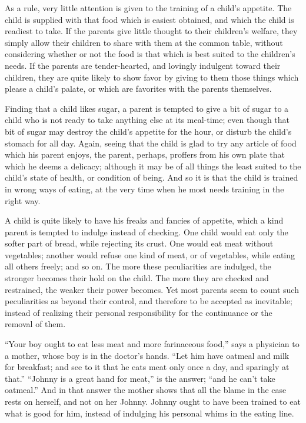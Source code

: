 \documentclass[
]{book}
\begin{document}
As a rule, very little attention is given to the training of a child's appetite. The child is supplied with that food which is easiest obtained, and which the child is readiest to take. If the parents give little thought to their children's welfare, they simply allow their children to share with them at the common table, without considering whether or not the food is that which is best suited to the children's needs. If the parents are tender-hearted, and lovingly indulgent toward their children, they are quite likely to show favor by giving to them those things which please a child's palate, or which are favorites with the parents themselves.

Finding that a child likes sugar, a parent is tempted to give a bit of sugar to a child who is not ready to take anything else at its meal-time; even though that bit of sugar may destroy the child's appetite for the hour, or disturb the child's stomach for all day. Again, seeing that the child is glad to try any article of food which his parent enjoys, the parent, perhaps, proffers from his own plate that which he deems a delicacy; although it may be of all things the least suited to the child's state of health, or condition of being. And so it is that the child is trained in wrong ways of eating, at the very time when he most needs training in the right way.

A child is quite likely to have his freaks and fancies of appetite, which a kind parent is tempted to indulge instead of checking. One child would eat only the softer part of bread, while rejecting its crust. One would eat meat without vegetables; another would refuse one kind of meat, or of vegetables, while eating all others freely; and so on. The more these peculiarities are indulged, the stronger becomes their hold on the child. The more they are checked and restrained, the weaker their power becomes. Yet most parents seem to count such peculiarities as beyond their control, and therefore to be accepted as inevitable; instead of realizing their personal responsibility for the continuance or the removal of them.

``Your boy ought to eat less meat and more farinaceous food,'' says a physician to a mother, whose boy is in the doctor's hands. ``Let him have oatmeal and milk for breakfast; and see to it that he eats meat only once a day, and sparingly at that.'' ``Johnny is a great hand for meat,'' is the answer; ``and he can't take oatmeal.'' And in that answer the mother shows that all the blame in the case rests on herself, and not on her Johnny. Johnny ought to have been trained to eat what is good for him, instead of indulging his personal whims in the eating line.
\end{document}
